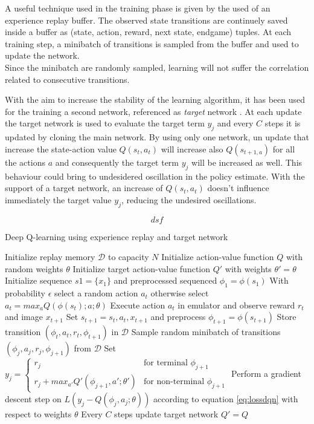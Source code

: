 \documentclass[article,11pt]{article}
\begin{document}
	
	A useful technique used in the training phase is given by the used of an experience replay buffer. The observed state transitions  are continuely saved inside a buffer as (state, action, reward, next state, endgame) tuples. At each training step, a minibatch of transitions is sampled from the buffer and used to update the network.
	\begin{equation}
		\label{dqn_update}
	\end{equation}
	Since the minibatch are randomly sampled, learning will not suffer the correlation related to consecutive transitions.
	
	With the aim to increase the stability of the learning algorithm, it has been used for the training a second network, referenced as \textit{target} network \cite{dqn2015}. At each update the target network is used to evaluate the target term $y_j$ and every $C$ steps it is updated by cloning the main network. By using only one network, un update that increase the state-action value $Q(s_t, a_t)$ will increase also $Q(s_{t+1, a})$ for all the actions $a$ and consequently the target term $y_j$ will be increased as well. This behaviour could bring to undesidered oscillation in the policy estimate.  With the support of a target network, an increase of $Q(s_t, a_t)$ doesn't influence immediately the target value $y_j$, reducing the undesired oscillations.
	
	\begin{equation}
		\label{eq:lossdqn}
		dsf
	\end{equation}
	
	\begin{algorithm}
		\caption{Deep Q-learning using experience replay and target network}
		\label{alg:dqn}
		\small
		\begin{algorithmic}
		\STATE Initialize replay memory $\mathcal{D}$ to capacity $N$
		\STATE Initialize action-value function $Q$ with random weights $\theta$
		\STATE Initialize target action-value function $Q'$ with weights $\theta'=\theta$
		\STATE Initialize sequence $s1 = \{x_1\}$ and preprocessed sequenced $\phi_1 = \phi(s_1)$
		\STATE With probability $\epsilon$ select a random action $a_t$
		\STATE otherwise select $a_t = max_a Q(\phi(s_t); a; \theta)$
		\STATE Execute action $a_t$ in emulator and observe reward $r_t$ and image $x_{t+1}$
		\STATE Set $s_{t+1} = s_t, a_t, x_{t+1}$ and preprocess $\phi_{t+1} = \phi(s_{t+1})$
		\STATE Store transition $(\phi_t, a_t, r_t, \phi_{t+1})$ in $\mathcal{D}$
		\STATE Sample random minibatch of transitions $(\phi_j, a_j, r_j, \phi_{j+1})$ from $\mathcal{D}$
		\STATE Set $y_j =
		\begin{cases}
			r_j & \text{for terminal } \phi_{j+1} \\
			r_j + max_{a'} Q'(\phi_{j+1}, a'; \theta') & \text{for non-terminal } \phi_{j+1}
		\end{cases}$
		\STATE Perform a gradient descent step on $L(y_j - Q(\phi_j, a_j ; \theta))$ according to equation \ref{eq:lossdqn} with respect to weights $\theta$ 
		\STATE Every $C$ steps update target network $Q'=Q$
		\ENDFOR
		\ENDFOR
		\end{algorithmic}
	\end{algorithm}
\end{document}
